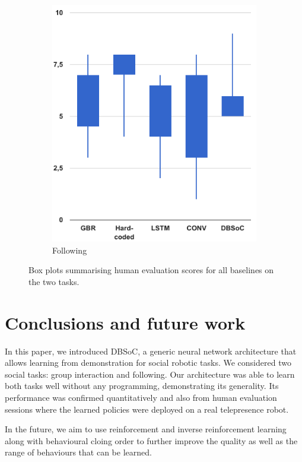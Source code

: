 \documentclass[letterpaper, 10 pt, conference]{ieeeconf}
\begin{document}
\begin{figure}[tbh]
\begin{subfigure}[b]{0.40\columnwidth}
    \includegraphics[scale = 0.30]{images/follow_candle.png}
    \caption{Following}
    \label{fig:follow}
  \end{subfigure} 
  \caption{Box plots summarising human evaluation scores for all baselines on the two tasks.}
  \label{fig:human}
  \end{figure}


\section{Conclusions and future work} 

In this paper, we introduced DBSoC, a generic neural network architecture that allows learning from demonstration for social robotic tasks. We considered two social tasks: group interaction and following. Our architecture was able to learn both tasks well without any programming, demonstrating its generality. Its performance was confirmed quantitatively and also from human evaluation sessions where the learned policies were deployed on a real telepresence robot. 

In the future, we aim to use reinforcement and inverse reinforcement learning along with behavioural cloing order to further improve the quality as well as the range of behaviours that can be learned.   



\end{document}
